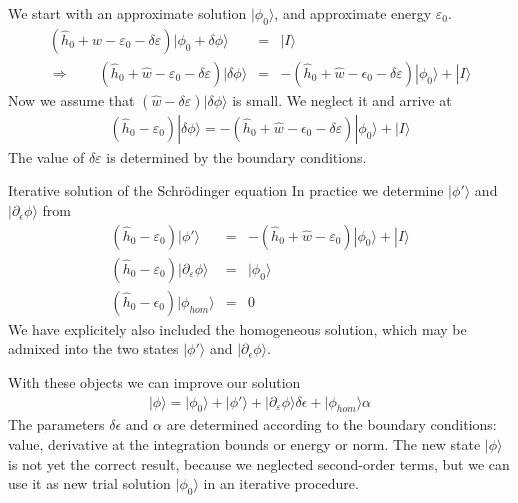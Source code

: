 \documentclass[11pt,a4paper]{report}
\begin{document}
We start with an approximate solution $|\phi_0\rangle$, and
approximate energy $\varepsilon_0$. 
\begin{eqnarray*}
\left(\hat{h}_0+\hat{w}-\varepsilon_0-\delta\varepsilon\right)
|\phi_0+\delta\phi\rangle&=&|I\rangle
\\
\Rightarrow\qquad
\left(\hat{h}_0+\hat{w}-\varepsilon_0-\delta\varepsilon\right)
|\delta\phi\rangle
&=&-\left(\hat{h}_0+\hat{w}-\epsilon_0-\delta\varepsilon\right)
|\phi_0\rangle
+|I\rangle
\end{eqnarray*}
Now we assume that $(\hat{w}-\delta\varepsilon)|\delta\phi\rangle$
is small. We neglect it and arrive at
\begin{eqnarray*}
\left(\hat{h}_0-\varepsilon_0\right)
|\delta\phi\rangle
=-\left(\hat{h}_0+\hat{w}-\epsilon_0-\delta\varepsilon\right)
|\phi_0\rangle
+|I\rangle
\end{eqnarray*}
The value of $\delta\varepsilon$ is determined by the boundary
conditions. 

\begin{myshadowminipage}{Iterative solution of the Schr\"odinger equation}
In practice we determine $|\phi'\rangle$ and $|\partial_\epsilon
\phi\rangle$ from
\begin{eqnarray*}
\left(\hat{h}_0-\varepsilon_0\right)
|\phi\prime\rangle
&=&-\left(\hat{h}_0+\hat{w}-\varepsilon_0\right)
|\phi_0\rangle
+|I\rangle
\\
\left(\hat{h}_0-\varepsilon_0\right)
|\partial_\varepsilon\phi\rangle
&=&|\phi_0\rangle
\\
(\hat{h}_0-\epsilon_0)|\phi_{hom}\rangle&=&0
\end{eqnarray*}
We have explicitely also included the homogeneous solution, which may
be admixed into the two states $|\phi'\rangle$ and
$|\partial_\epsilon\phi\rangle$.

With these objects we can improve our solution
\begin{eqnarray*}
|\phi\rangle=|\phi_0\rangle+|\phi'\rangle
+|\partial_\varepsilon\phi\rangle\delta\epsilon+|\phi_{hom}\rangle \alpha
\end{eqnarray*}
The parameters $\delta\epsilon$ and $\alpha$ are determined according
to the boundary conditions: value, derivative at the integration
bounds or energy or norm.
The new state $|\phi\rangle$ is not yet the correct result, because we
neglected second-order terms, but we can use it as new trial solution
$|\phi_0\rangle$ in an iterative procedure.
\end{myshadowminipage}
\end{document}
